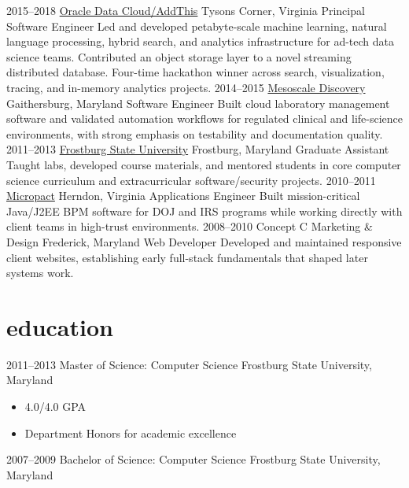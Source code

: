 \documentclass[]{friggeri-cv} %
\begin{document}
\begin{entrylist}
{}
\entry
{2015--2018}
{\href{https://www.addthis.com/}{Oracle Data Cloud/AddThis}}
{Tysons Corner, Virginia}
{Principal Software Engineer}
{
	Led and developed petabyte-scale machine learning, natural language processing, hybrid search, and analytics infrastructure for ad-tech data science teams. Contributed an object storage layer to a novel streaming distributed database. Four-time hackathon winner across search, visualization, tracing, and in-memory analytics projects.
}
\entry
{2014--2015}
{\href{https://www.mesoscale.com/}{Mesoscale Discovery}}
{Gaithersburg, Maryland}
{Software Engineer}
{
	Built cloud laboratory management software and validated automation workflows for regulated clinical and life-science environments, with strong emphasis on testability and documentation quality.
}
\entry
{2011--2013}
{\href{http://www.frostburg.edu/}{Frostburg State University}}
{Frostburg, Maryland}
{Graduate Assistant}
{
	Taught labs, developed course materials, and mentored students in core computer science curriculum and extracurricular software/security projects.
}
\entry
{2010--2011}
{\href{https://www.micropact.com/}{Micropact}}
{Herndon, Virginia}
{Applications Engineer}
{
	Built mission-critical Java/J2EE BPM software for DOJ and IRS programs while working directly with client teams in high-trust environments.
}
\entry
{2008--2010}
{Concept C Marketing \& Design}
{Frederick, Maryland}
{Web Developer}
{
	Developed and maintained responsive client websites, establishing early full-stack fundamentals that shaped later systems work.
}
\end{entrylist}

\section{education}

\begin{entrylist}
\entryFour
{2011--2013}
{Master {\normalfont of Science: Computer Science}}
{Frostburg State University, Maryland}
{
		\begin{itemize}
		\item 4.0/4.0 GPA
	\item Department Honors for academic excellence 
	\end{itemize}
}
\entryFour
{2007--2009}
{Bachelor {\normalfont of Science: Computer Science}}
{Frostburg State University, Maryland}
{}

\end{entrylist}
\end{document}
